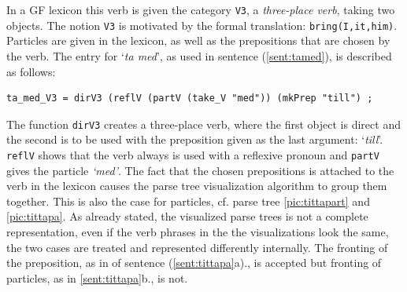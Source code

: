 \documentclass{report}
\begin{document}
In a GF lexicon this verb is given the
category \verb-V3-, %
a \textit{three-place verb}, taking two objects.
The notion \verb-V3- is motivated by the formal translation: \verb-bring(I,it,him)-.\\
Particles are given in the lexicon, as well as the prepositions that are
chosen by the verb.
The entry for `\emph{ta med}', as used in sentence (\ref{sent:tamed}), is
described as follows:
\begin{verbatim}
ta_med_V3 = dirV3 (reflV (partV (take_V "med")) (mkPrep "till") ;
\end{verbatim}
The function \verb-dirV3- creates a three-place verb, where the first object is direct and
the second is to be used with the preposition given as the last argument: `\emph{till}'.
\verb-reflV- shows that the verb always is used with a reflexive
pronoun and \verb-partV- gives the particle \emph{`med'}.
The fact that the chosen prepositions is attached to the verb in the lexicon
causes the parse tree visualization algorithm to group them together.
This is also the case for particles, cf. parse tree \ref{pic:tittapart}
and \ref{pic:tittapa}.
As already stated, the visualized parse trees is not a complete representation,
even if the verb phrases in the the visualizations look the same, the two cases
are treated and represented differently internally. The fronting of the
preposition, as in of sentence (\ref{sent:tittapa}a)., is accepted but
fronting of particles, as in \ref{sent:tittapa}b., is not.
\end{document}
